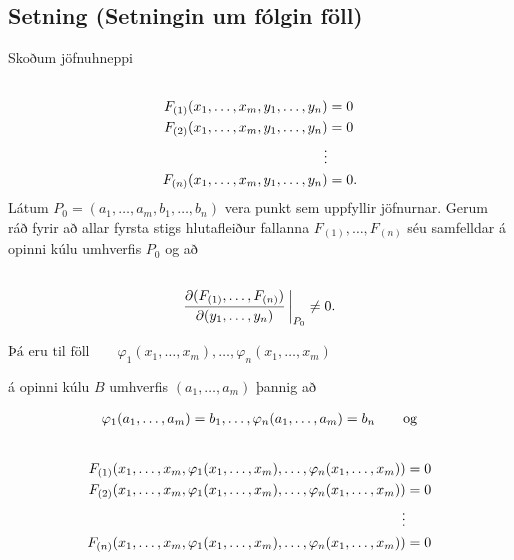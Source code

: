 \documentclass[a4paper,10pt,icelandic]{sphinxmanual}
\begin{document}
\subsection{Setning (Setningin um fólgin föll)}
\label{Kafli2:index-28}\label{Kafli2:setning-setningin-um-folgin-foll}
Skoðum jöfnuhneppi
\begin{gather}
\begin{split}\displaystyle\end{split}\notag\\\begin{split}\begin{aligned}
F_{(1)}(x_1,\ldots,x_m, y_1, \ldots, y_n)&=0\\
F_{(2)}(x_1,\ldots,x_m, y_1, \ldots, y_n)&=0\\
\vdots\\
F_{(n)}(x_1,\ldots,x_m, y_1, \ldots, y_n)&=0.\end{aligned}\end{split}\notag
\end{gather}
Látum \(P_0=(a_1,\ldots, a_m, b_1,\ldots, b_n)\) vera punkt sem
uppfyllir jöfnurnar. Gerum ráð fyrir að allar fyrsta stigs hlutafleiður
fallanna \(F_{(1)},\ldots, F_{(n)}\) séu samfelldar á opinni kúlu
umhverfis \(P_0\) og að
\begin{gather}
\begin{split}\displaystyle\end{split}\notag\\\begin{split}\frac{\partial(F_{(1)}, \ldots, F_{(n)})}
{\partial( y_1, \ldots, y_n)}\,\bigg|_{P_0}\neq 0.\end{split}\notag
\end{gather}
\begin{DUlineblock}{0em}
\item[] \(\text{Þá eru til föll} \qquad \varphi_1(x_1,\ldots,x_m),\ldots,\varphi_n(x_1,\ldots,x_m)\)
\item[] á opinni kúlu \(B\) umhverfis \((a_1,\ldots,a_m)\) þannig að
\end{DUlineblock}
\begin{gather}
\begin{split}\displaystyle \varphi_1(a_1,\ldots,a_m)=b_1,\ldots,\varphi_n(a_1,\ldots,a_m)=b_n \qquad \text{og}\end{split}\notag
\end{gather}\begin{gather}
\begin{split}\displaystyle\end{split}\notag\\\begin{split}\begin{aligned}
F_{(1)}(x_1,\ldots,x_m, \varphi_1(x_1,\ldots,x_m),\ldots,
\varphi_n(x_1,\ldots,x_m))&=0\\
F_{(2)}(x_1,\ldots,x_m, \varphi_1(x_1,\ldots,x_m),\ldots,
\varphi_n(x_1,\ldots,x_m))&=0\\
\vdots\\
F_{(n)}(x_1,\ldots,x_m, \varphi_1(x_1,\ldots,x_m),\ldots,
\varphi_n(x_1,\ldots,x_m))&=0\end{aligned}\end{split}\notag
\end{gather}
\end{document}
